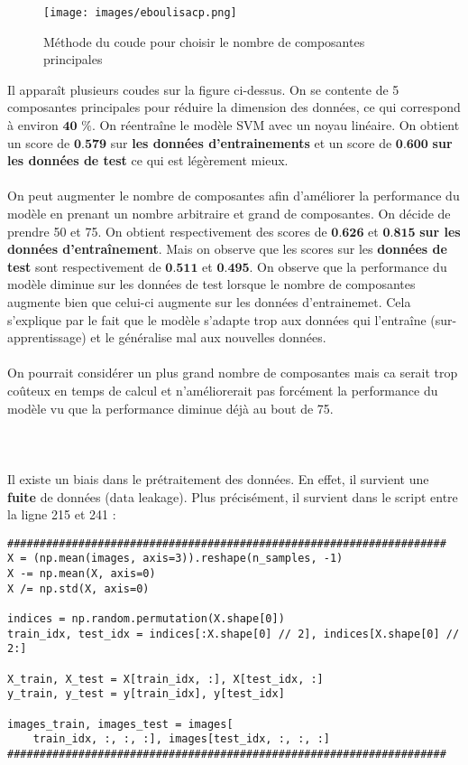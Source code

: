 \documentclass[a4paper, 12pt]{article}
\begin{document}
\begin{figure}[h!]
    \centering
    \texttt{[image: images/eboulisacp.png]}
    \caption{Méthode du coude pour choisir le nombre de composantes principales}
    \label{fig:elbow}
\end{figure}

\newpage
Il apparaît plusieurs coudes sur la figure ci-dessus. On se contente de 5 composantes principales pour réduire la dimension des données, ce qui correspond à environ $\textbf{40 \% }$.
On réentraîne le modèle SVM avec un noyau linéaire. On obtient un score de $\textbf{0.579}$ sur \textbf{les données d'entrainements} et un score de $\textbf{0.600}$ \textbf{sur les données de test} ce qui est légèrement mieux.
\\
\\
On peut augmenter le nombre de composantes afin d'améliorer la performance du modèle en prenant un nombre arbitraire et grand de composantes. On décide de prendre 50 et 75. On obtient respectivement des scores de $\textbf{0.626}$ et $\textbf{0.815}$ \textbf{sur les données d'entraînement}. Mais on observe que les scores sur les \textbf{données de test} sont respectivement de $\textbf{0.511}$ et $\textbf{0.495}$.
On observe que la performance du modèle diminue sur les données de test lorsque le nombre de composantes augmente bien que celui-ci augmente sur les données d'entrainemet. Cela s'explique par le fait que le modèle s'adapte trop aux données qui l'entraîne (sur-apprentissage) et le généralise mal aux nouvelles données.
\\
\\
On pourrait considérer un plus grand nombre de composantes mais ca serait trop coûteux en temps de calcul et n'améliorerait pas forcément la performance du modèle vu que la performance diminue déjà au bout de 75.
\\
\\
\\
\\
Il existe un biais dans le prétraitement des données. En effet, il survient une \textbf{fuite} de données (data leakage).
Plus précisément, il survient dans le script entre la ligne 215 et 241 :

\begin{verbatim}
####################################################################
X = (np.mean(images, axis=3)).reshape(n_samples, -1)
X -= np.mean(X, axis=0)
X /= np.std(X, axis=0)

indices = np.random.permutation(X.shape[0])
train_idx, test_idx = indices[:X.shape[0] // 2], indices[X.shape[0] // 2:]

X_train, X_test = X[train_idx, :], X[test_idx, :]
y_train, y_test = y[train_idx], y[test_idx]

images_train, images_test = images[
    train_idx, :, :, :], images[test_idx, :, :, :]
####################################################################
\end{verbatim}
\end{document}
